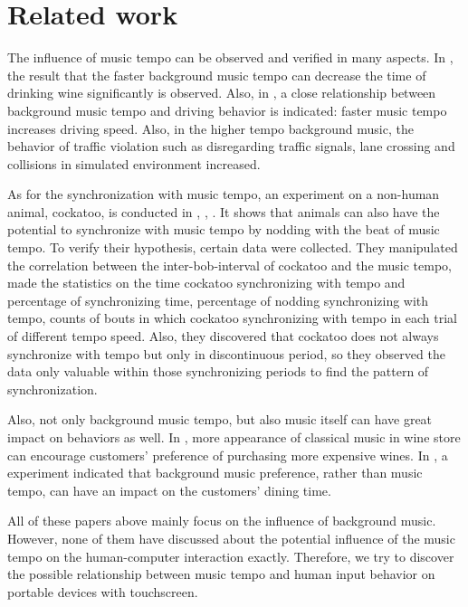 \section{Related work}

The influence of music tempo can be observed and verified in many aspects. In \cite{mcelrea:drinking}, the result that the faster background music tempo can decrease the time of drinking wine significantly is observed. Also, in \cite{patel:non-human1}, a close relationship between background music tempo and driving behavior is indicated: faster music tempo increases driving speed. Also, in the higher tempo background music, the behavior of traffic violation such as disregarding traffic signals, lane crossing and collisions in simulated environment increased. 

As for the synchronization with music tempo, an experiment on a non-human animal, cockatoo, is conducted in \cite{patel:non-human1}, \cite{patel:non-human2}, \cite{patel:non-human3}. It shows that animals can also have the potential to synchronize with music tempo by nodding with the beat of music tempo. To verify their hypothesis, certain data were collected. They manipulated the correlation between the inter-bob-interval of cockatoo and the music tempo, made the statistics on the time cockatoo synchronizing with tempo and percentage of synchronizing time, percentage of nodding synchronizing with tempo, counts of bouts in which cockatoo synchronizing with tempo in each trial of different tempo speed. Also, they discovered that cockatoo does not always synchronize with tempo but only in discontinuous period, so they observed the data only valuable within those synchronizing periods to find the pattern of synchronization.

Also, not only background music tempo, but also music itself can have great impact on behaviors as well. In \cite{areni:shopping}, more appearance of classical music in wine store can encourage customers' preference of purchasing more expensive wines. In \cite{Caldwell:dining}, a experiment indicated that background music preference, rather than music tempo, can have an impact on the customers' dining time. 

All of these papers above mainly focus on the influence of background music. However, none of them have discussed about the potential influence of the music tempo on the human-computer interaction exactly. Therefore, we try to discover the possible relationship between music tempo and human input behavior on portable devices with touchscreen.